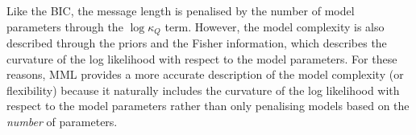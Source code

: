 \documentclass[twocolumn]{aastex62}
\newcommand{\todo}[1]{\textcolor{red}{#1}}
\begin{document}
Like the BIC, the message length is penalised by the number of model parameters
through the $\log\kappa_Q$ term. However, the model complexity is also 
described through the priors and the Fisher information, which
describes the curvature of the log likelihood with respect to the model
parameters. For these reasons, MML provides a more accurate description of
the model complexity (or flexibility) because it naturally includes the 
curvature of the log likelihood with respect to the model parameters
rather than only penalising models based on the \emph{number} of
parameters.


\end{document}
